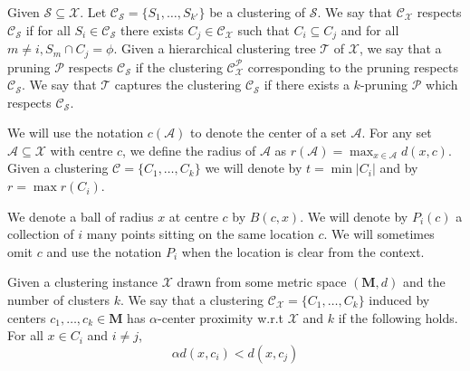 \documentclass[anon,12pt]{colt2016} %
\newcommand{\mc}{\mathcal}
\newcommand{\mb}{\mathbf}
\begin{document}
Given $\mc S \subseteq \mc X$. Let $\mc C_{\mc S} = \{S_1, \ldots, S_{k'}\}$ be a clustering of $\mc S$. We say that $\mc C_{\mc X}$ respects $\mc C_{\mc S}$ if for all $S_i \in \mc C_{\mc S}$ there exists $C_j \in \mc C_{\mc X}$ such that $C_i \subseteq C_j$ and for all $m \neq i, S_m \cap C_j = \phi$. Given a hierarchical clustering tree $\mc T$ of $\mc X$, we say that a pruning $\mc P$ respects $\mc C_{\mc S}$ if the clustering $\mc C_{\mc X}^{\mc P}$ corresponding to the pruning respects $\mc C_{\mc S}$. We say that $\mc T$ captures the clustering $\mc C_{\mc S}$ if there exists a $k$-pruning $\mc P$ which respects $\mc C_{\mc S}$.

We will use the notation $c(\mc A)$ to denote the center of a set $\mc A$. For any set $\mc A\subseteq \mc X$ with centre $c$, we define the radius of $\mc A$ as $r(\mc A) = \max_{x \in \mc A} d(x, c)$. Given a clustering $\mc C = \{C_1, \ldots, C_k\}$ we will denote by $t = \min |C_i|$ and by $r = \max r(C_i)$. 

We denote a ball of radius $x$ at centre $c$ by $B(c, x)$. We will denote by $P_{i}(c)$ a collection of $i$ many points sitting on the same location $c$. We will sometimes omit $c$ and use the notation $P_i$ when the location is clear from the context.



\begin{definition}
\label{defn:alphacp}
Given a clustering instance $\mc X$ drawn from some metric space $(\mb M, d)$ and the number of clusters $k$. We say that a clustering $\mc C_{\mc X} = \{C_1, \ldots, C_k\}$ induced by centers $c_1, \ldots, c_k \in \mb M$ has $\alpha$-center proximity w.r.t $\mc X$ and $k$ if the following holds. For all $x \in C_i$ and $i\neq j$, 
$$\alpha d(x, c_i) < d(x, c_j)$$
\end{definition}
\end{document}
